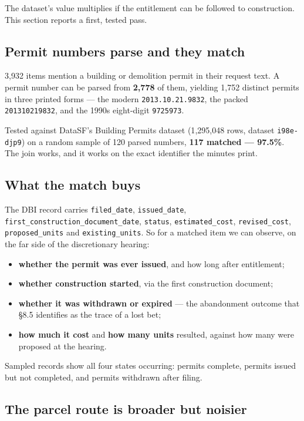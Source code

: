 \documentclass[11pt]{article}
\begin{document}
The dataset's value multiplies if the entitlement can be followed to construction. This
section reports a first, tested pass.

\subsection{Permit numbers parse and they match}

3{,}932 items mention a building or demolition permit in their request text. A permit number
can be parsed from \textbf{2{,}778} of them, yielding 1{,}752 distinct permits in three printed
forms --- the modern \texttt{2013.10.21.9832}, the packed \texttt{201310219832}, and the
1990s eight-digit \texttt{9725973}.

Tested against DataSF's Building Permits dataset (1{,}295{,}048 rows, dataset
\texttt{i98e-djp9}) on a random sample of 120 parsed numbers, \textbf{117 matched --- 97.5\%}.
The join works, and it works on the exact identifier the minutes print.

\subsection{What the match buys}

The DBI record carries \texttt{filed\_date}, \texttt{issued\_date},
\texttt{first\_construction\_document\_date}, \texttt{status}, \texttt{estimated\_cost},
\texttt{revised\_cost}, \texttt{proposed\_units} and \texttt{existing\_units}. So for a matched
item we can observe, on the far side of the discretionary hearing:

\begin{itemize}
\item \textbf{whether the permit was ever issued}, and how long after entitlement;
\item \textbf{whether construction started}, via the first construction document;
\item \textbf{whether it was withdrawn or expired} --- the abandonment outcome that \S8.5
identifies as the trace of a lost bet;
\item \textbf{how much it cost} and \textbf{how many units} resulted, against how many were
proposed at the hearing.
\end{itemize}

Sampled records show all four states occurring: permits complete, permits issued but not
completed, and permits withdrawn after filing.

\subsection{The parcel route is broader but noisier}
\end{document}

